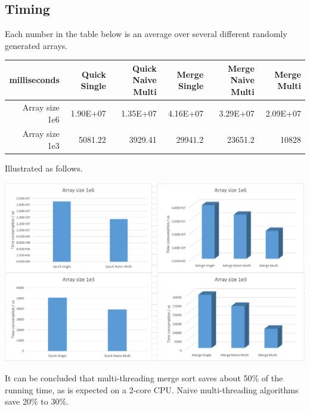 \begin{homeworkProblem}
\subsection{Timing}
Each number in the table below is an average over several different randomly generated arrays.
\begin{center}
\begin{tabular}{rrrrrr}
\hline
milliseconds&   Quick Single&	Quick Naive Multi&	Merge Single&	Merge Naive Multi&	Merge Multi\\
\hline
Array size 1e6&	1.90E+07&	1.35E+07&	4.16E+07&	3.29E+07&	2.09E+07\\
Array size 1e3& 	5081.22&	3929.41&	29941.2&	23651.2&	10828\\
\hline
\end{tabular}
\end{center}

Illustrated as follows.

\includegraphics[width=1\columnwidth]{sort}

It can be concluded that multi-threading merge sort saves about 50\% of the running time, as is expected on a 2-core CPU. Naive multi-threading algorithms save 20\% to 30\%.


\end{homeworkProblem}






